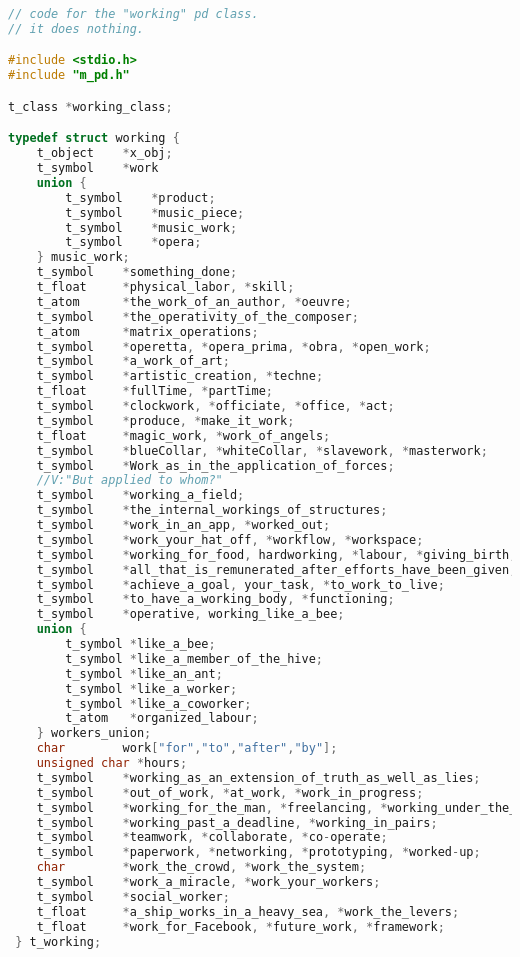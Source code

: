 \begin{flushleft}
\footnotesize
\begin{lstlisting}[caption={Working Pd Class},captionpos=b,language=C]
// code for the "working" pd class. 
// it does nothing.

#include <stdio.h>
#include "m_pd.h"

t_class *working_class;

typedef struct working {
	t_object 	*x_obj;
	t_symbol	*work
	union {
		t_symbol    *product;
		t_symbol 	*music_piece;
		t_symbol 	*music_work;
		t_symbol 	*opera;
	} music_work;
	t_symbol 	*something_done;
	t_float		*physical_labor, *skill;
	t_atom		*the_work_of_an_author, *oeuvre;
	t_symbol	*the_operativity_of_the_composer;
	t_atom		*matrix_operations;
	t_symbol	*operetta, *opera_prima, *obra, *open_work;
	t_symbol	*a_work_of_art;
	t_symbol	*artistic_creation, *techne;
	t_float		*fullTime, *partTime;
	t_symbol	*clockwork, *officiate, *office, *act;
	t_symbol	*produce, *make_it_work;
	t_float		*magic_work, *work_of_angels;
	t_symbol	*blueCollar, *whiteCollar, *slavework, *masterwork;
	t_symbol	*Work_as_in_the_application_of_forces;
	//V:"But applied to whom?"
	t_symbol	*working_a_field;
	t_symbol	*the_internal_workings_of_structures;
	t_symbol	*work_in_an_app, *worked_out;
	t_symbol	*work_your_hat_off, *workflow, *workspace;
	t_symbol	*working_for_food, hardworking, *labour, *giving_birth;
	t_symbol	*all_that_is_remunerated_after_efforts_have_been_given;
	t_symbol	*achieve_a_goal, your_task, *to_work_to_live;
	t_symbol	*to_have_a_working_body, *functioning;
	t_symbol	*operative, working_like_a_bee;
	union {
		t_symbol *like_a_bee;
		t_symbol *like_a_member_of_the_hive;
		t_symbol *like_an_ant;
		t_symbol *like_a_worker;
		t_symbol *like_a_coworker;
		t_atom	 *organized_labour;
	} workers_union;
	char 		work["for","to","after","by"];
	unsigned char *hours;
	t_symbol	*working_as_an_extension_of_truth_as_well_as_lies;
	t_symbol	*out_of_work, *at_work, *work_in_progress;
	t_symbol	*working_for_the_man, *freelancing, *working_under_the_table;
	t_symbol	*working_past_a_deadline, *working_in_pairs;
	t_symbol	*teamwork, *collaborate, *co-operate;
	t_symbol	*paperwork, *networking, *prototyping, *worked-up;
	char		*work_the_crowd, *work_the_system;
	t_symbol	*work_a_miracle, *work_your_workers;
	t_symbol	*social_worker;
	t_float		*a_ship_works_in_a_heavy_sea, *work_the_levers;
	t_float		*work_for_Facebook, *future_work, *framework;
 } t_working;
\end{lstlisting}
\end{flushleft}
